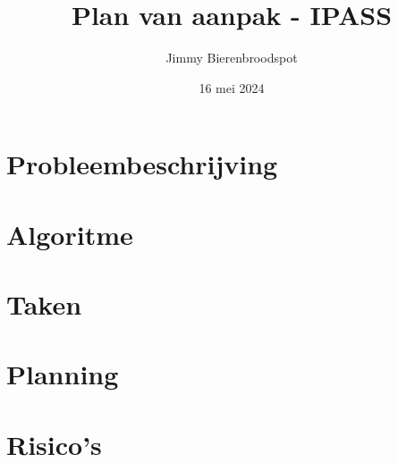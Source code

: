 \documentclass{article}
\title{Plan van aanpak - IPASS}
\author{Jimmy Bierenbroodspot}
\date{16 mei 2024}
\begin{document}
\begin{titlepage}
    \maketitle
\end{titlepage}

\section{Probleembeschrijving}

\section{Algoritme}

\section{Taken}

\section{Planning}

\section{Risico's}
\end{document}
